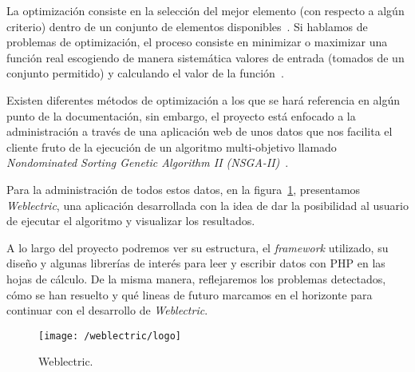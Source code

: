
La optimización consiste en la selección del mejor elemento (con respecto a algún criterio) dentro de un conjunto de elementos disponibles~\cite{wiki:optimizacion}. Si hablamos de problemas de optimización, el proceso consiste en minimizar o maximizar una función real escogiendo de manera sistemática valores de entrada (tomados de un conjunto permitido) y calculando el valor de la función~\cite{wiki:optimizacion}.

Existen diferentes métodos de optimización a los que se hará referencia en algún punto de la documentación, sin embargo, el proyecto está enfocado a la administración a través de una aplicación web de unos datos que nos facilita el cliente fruto de la ejecución de un algoritmo multi-objetivo llamado \textit{Nondominated Sorting Genetic Algorithm II (NSGA-II)}~\cite{pdf:nsga-ii}.

Para la administración de todos estos datos, en la figura~\ref{fig:weblectric}, presentamos \textit{Weblectric}, una aplicación desarrollada con la idea de dar la posibilidad al usuario de ejecutar el algoritmo y visualizar los resultados.

A lo largo del proyecto podremos ver su estructura, el \textit{framework} utilizado, su diseño y algunas librerías de interés para leer y escribir datos con PHP en las hojas de cálculo. De la misma manera, reflejaremos los problemas detectados, cómo se han resuelto y qué lineas de futuro marcamos en el horizonte para continuar con el desarrollo de \textit{Weblectric}.

\begin{figure}[ht]
	\centering
	\texttt{[image: /weblectric/logo]}
	\caption{Weblectric.}
	\label{fig:weblectric}
\end{figure}